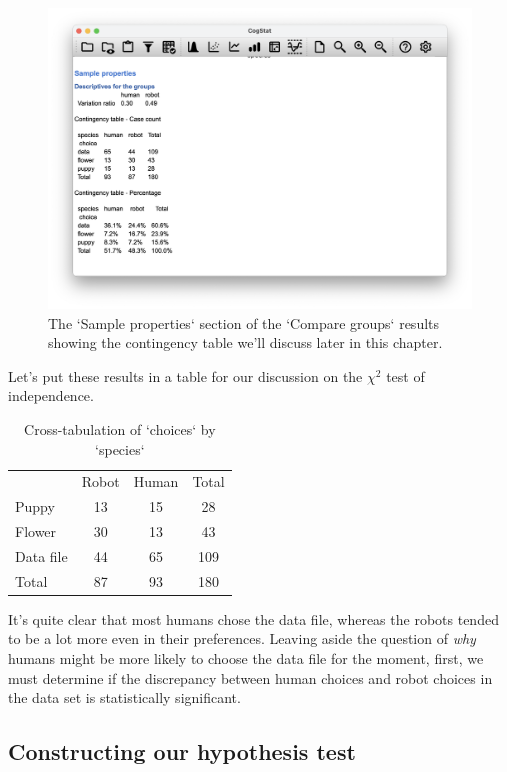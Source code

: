 \documentclass[
  11pt,
  a4paper,
  twoside,symmetric,openright]{book}
\theoremstyle{break}
\theoremstyle{break}
\begin{document}
\begin{figure}

{\centering \includegraphics[width=0.6\linewidth]{resources/image/cogstatchapek9descriptives} 

}

\caption{The `Sample properties` section of the `Compare groups` results showing the contingency table we'll discuss later in this chapter.}\label{fig:cogstatchapek9descriptives}
\end{figure}

Let's put these results in a table for our discussion on the \(\chi^2\) test of independence.

\begin{table}[!h]

\caption{\label{tab:unnamed-chunk-41}Cross-tabulation of `choices` by `species`}
\centering
\begin{tabular}[t]{lccc}
\toprule
 & Robot & Human & Total\\
Puppy & 13 & 15 & 28\\
Flower & 30 & 13 & 43\\
Data file & 44 & 65 & 109\\
Total & 87 & 93 & 180\\
\bottomrule
\end{tabular}
\end{table}

It's quite clear that most humans chose the data file, whereas the robots tended to be a lot more even in their preferences. Leaving aside the question of \emph{why} humans might be more likely to choose the data file for the moment, first, we must determine if the discrepancy between human choices and robot choices in the data set is statistically significant.

\subsection{Constructing our hypothesis test}\label{constructing-our-hypothesis-test}
\end{document}

